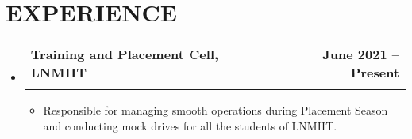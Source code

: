 \documentclass[letterpaper,11pt]{article}
\makeatletter
\newcommand{\resumeItem}[1]{
  \item\small{
    {#1 \vspace{-2pt}}
  }
}
\newcommand{\resumeSubheading}[4]{
  \vspace{-2pt}\item
    \begin{tabular*}{1.0\textwidth}[t]{l@{\extracolsep{\fill}}r}
      \textbf{#1} & \textbf{\small #2} \\
      \text{\small#3} & \text{\small #4} \\
    \end{tabular*}\vspace{-7pt}
}
\newcommand{\resumeSubHeadingListStart}{\begin{itemize}[leftmargin=0.0in, label={}]}
\newcommand{\resumeSubHeadingListEnd}{\end{itemize}}
\newcommand{\resumeItemListStart}{\begin{itemize}}
\newcommand{\resumeItemListEnd}{\end{itemize}\vspace{-5pt}}
\makeatother
\begin{document}
\section{EXPERIENCE}
  \resumeSubHeadingListStart

    \resumeSubheading
      {Training and Placement Cell, LNMIIT}{June 2021 -- Present}
      {Member}{Jaipur, Rajasthan}
      \resumeItemListStart
        \resumeItem{Responsible for managing smooth operations during Placement Season and conducting mock drives for all the students of LNMIIT.}
      \resumeItemListEnd

    
  \resumeSubHeadingListEnd
\vspace{-16pt}

\end{document}
